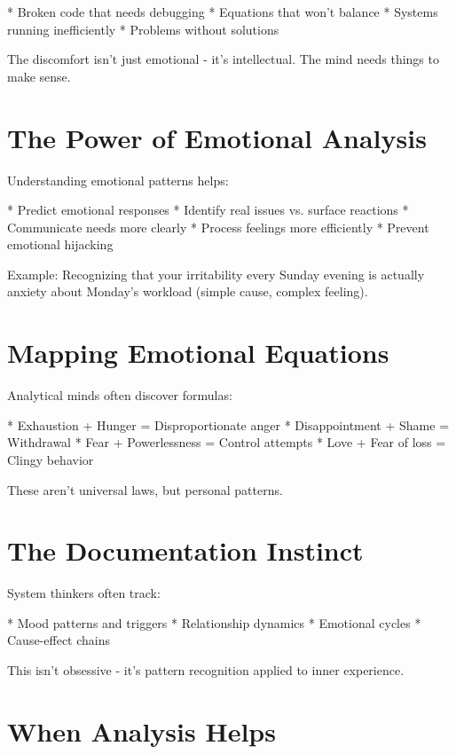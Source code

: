 \documentclass[12pt,oneside]{book}
\begin{document}
                    * Broken code that needs debugging
                    * Equations that won't balance
                    * Systems running inefficiently
                    * Problems without solutions

The discomfort isn't just emotional - it's intellectual. The mind needs things to make sense.

\section{The Power of Emotional Analysis}

Understanding emotional patterns helps:

                    * Predict emotional responses
                    * Identify real issues vs. surface reactions
                    * Communicate needs more clearly
                    * Process feelings more efficiently
                    * Prevent emotional hijacking

Example: Recognizing that your irritability every Sunday evening is actually anxiety about Monday's workload (simple cause, complex feeling).

\section{Mapping Emotional Equations}

Analytical minds often discover formulas:

                    * Exhaustion + Hunger = Disproportionate anger
                    * Disappointment + Shame = Withdrawal
                    * Fear + Powerlessness = Control attempts
                    * Love + Fear of loss = Clingy behavior

These aren't universal laws, but personal patterns.

\section{The Documentation Instinct}

System thinkers often track:

                    * Mood patterns and triggers
                    * Relationship dynamics
                    * Emotional cycles
                    * Cause-effect chains

This isn't obsessive - it's pattern recognition applied to inner experience.

\section{When Analysis Helps}
\end{document}
